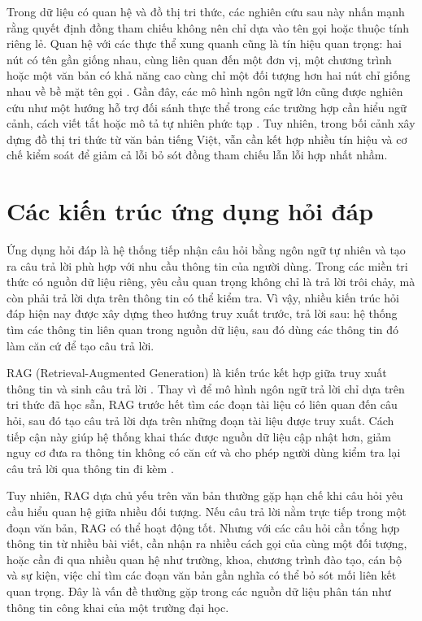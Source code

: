 Trong dữ liệu có quan hệ và đồ thị tri thức, các nghiên cứu sau này nhấn mạnh rằng quyết định đồng tham chiếu không nên chỉ dựa vào tên gọi hoặc thuộc tính riêng lẻ. Quan hệ với các thực thể xung quanh cũng là tín hiệu quan trọng: hai nút có tên gần giống nhau, cùng liên quan đến một đơn vị, một chương trình hoặc một văn bản có khả năng cao cùng chỉ một đối tượng hơn hai nút chỉ giống nhau về bề mặt tên gọi \cite{bhattacharya2007collective,weikum2021machine}. Gần đây, các mô hình ngôn ngữ lớn cũng được nghiên cứu như một hướng hỗ trợ đối sánh thực thể trong các trường hợp cần hiểu ngữ cảnh, cách viết tắt hoặc mô tả tự nhiên phức tạp \cite{peeters2023using}. Tuy nhiên, trong bối cảnh xây dựng đồ thị tri thức từ văn bản tiếng Việt, vẫn cần kết hợp nhiều tín hiệu và cơ chế kiểm soát để giảm cả lỗi bỏ sót đồng tham chiếu lẫn lỗi hợp nhất nhầm.

\section{Các kiến trúc ứng dụng hỏi đáp}

Ứng dụng hỏi đáp là hệ thống tiếp nhận câu hỏi bằng ngôn ngữ tự nhiên và tạo ra câu trả lời phù hợp với nhu cầu thông tin của người dùng. Trong các miền tri thức có nguồn dữ liệu riêng, yêu cầu quan trọng không chỉ là trả lời trôi chảy, mà còn phải trả lời dựa trên thông tin có thể kiểm tra. Vì vậy, nhiều kiến trúc hỏi đáp hiện nay được xây dựng theo hướng truy xuất trước, trả lời sau: hệ thống tìm các thông tin liên quan trong nguồn dữ liệu, sau đó dùng các thông tin đó làm căn cứ để tạo câu trả lời.

RAG (Retrieval-Augmented Generation) là kiến trúc kết hợp giữa truy xuất thông tin và sinh câu trả lời \cite{lewis2020retrieval}. Thay vì để mô hình ngôn ngữ trả lời chỉ dựa trên tri thức đã học sẵn, RAG trước hết tìm các đoạn tài liệu có liên quan đến câu hỏi, sau đó tạo câu trả lời dựa trên những đoạn tài liệu được truy xuất. Cách tiếp cận này giúp hệ thống khai thác được nguồn dữ liệu cập nhật hơn, giảm nguy cơ đưa ra thông tin không có căn cứ và cho phép người dùng kiểm tra lại câu trả lời qua thông tin đi kèm \cite{gao2023retrieval}.

Tuy nhiên, RAG dựa chủ yếu trên văn bản thường gặp hạn chế khi câu hỏi yêu cầu hiểu quan hệ giữa nhiều đối tượng. Nếu câu trả lời nằm trực tiếp trong một đoạn văn bản, RAG có thể hoạt động tốt. Nhưng với các câu hỏi cần tổng hợp thông tin từ nhiều bài viết, cần nhận ra nhiều cách gọi của cùng một đối tượng, hoặc cần đi qua nhiều quan hệ như trường, khoa, chương trình đào tạo, cán bộ và sự kiện, việc chỉ tìm các đoạn văn bản gần nghĩa có thể bỏ sót mối liên kết quan trọng. Đây là vấn đề thường gặp trong các nguồn dữ liệu phân tán như thông tin công khai của một trường đại học.

